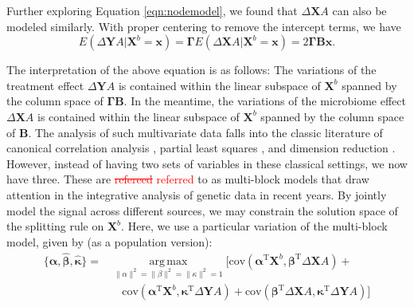 \documentclass[smallextended]{svjour3}
\DeclareMathOperator*{\argmax}{arg\,max}
\newcommand{\trnp}{^\text{T}}
\newcommand{\bg}[1]{\textcolor{red}{#1}}
\begin{document}
Further exploring Equation \eqref{eqn:nodemodel}, we found that $\Delta \bm X A$ can also be modeled similarly. With proper centering to remove the intercept terms, we have
\begin{equation}
    E(\Delta \bm Y A | \bm X^b=\bm x) = \bm \Gamma E(\Delta \bm X A | \bm X^b = \bm x) = 2\bm \Gamma \bm B \bm x. \label{eqn:threesides}
\end{equation}

The interpretation of the above equation is as follows: The variations of the treatment effect $\Delta \bm Y A$ is contained within the linear subspace of $\bm X^b$ spanned by the column space of $\bm \Gamma \bm B$. In the meantime, the variations of the microbiome effect $\Delta \bm X A $ is contained within the linear subspace of $\bm X^b$ spanned by the column space of $\bm B$. The analysis of such multivariate data falls into the classic literature of canonical correlation analysis \citep{hotelling1936relations}, partial least squares \citep{wold2001pls}, and dimension reduction \citep{cook2010envelope}. However, instead of having two sets of variables in these classical settings, we now have three. These are \bg{\st{refereed} referred} to as multi-block models \citep{tenenhaus2011regularized, tenenhaus2017regularized} that draw attention in the integrative analysis of genetic data \citep{meng2016dimension, rohart2017mixomics} in recent years. By jointly model the signal across different sources, we may constrain the solution space of the splitting rule on $\bm X^b$. Here, we use a particular variation of the multi-block model, given by (as a population version):
\begin{align}
\{\bm{\widehat{\alpha}}, \bm{\widehat{\beta}}, \bm{\widehat{\kappa}}\} = & \argmax\limits_{\lVert\alpha\rVert^2 = \lVert\beta\rVert^2 = \lVert\kappa\rVert^2 = 1}
\Big[ \text{cov}( \bm \alpha\trnp \bm{X}^b, \bm \beta \trnp \Delta \bm{X} A ) + \nonumber \\ 
&\quad \text{cov} (\bm \alpha\trnp \bm{X}^b, \bm \kappa \trnp \Delta \bm{Y} A) +\text{cov}(\bm \beta\trnp \Delta \bm{X} A, \bm \kappa\trnp \Delta \bm{Y} A ) \Big] \label{eqn:multiblock}
\end{align}
\end{document}
